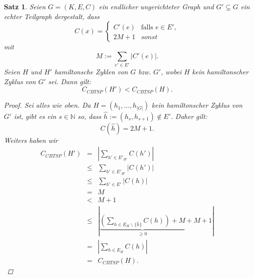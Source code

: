 \documentclass[10pt,oneside,a4paper]{report}
\newcommand{\nat}{\mathbb{N}}
\newtheorem{Def}{Definition}
\newtheorem{Satz}[Def]{Satz}
\begin{document}
\begin{Satz}
	Seien $G=(K,E,C)$ ein endlicher ungerichteter Graph und $G'\subsetneq G$ ein echter Teilgraph dergestalt, dass
	$$C(x) =
	\begin{cases}
		C'(e) & \text{falls } e\in E',\\
		2M+1 & sonst
	\end{cases}$$
	mit 
	$$M:= \sum_{e'\in E'}|C'(e)|.$$
	Seien $H$ und $H'$ hamiltonsche Zyklen von $G$ bzw. $G'$, wobei $H$ kein hamiltonscher Zyklus von $G'$ sei.
	Dann gilt:
	$$C_{CBTSP}(H') < C_{CBTSP}(H).$$
	\begin{proof}
		Sei alles wie oben. Da $H=(h_1,...,h_{|G|})$ kein hamiltonscher Zyklus von $G'$ ist, gibt es ein $s\in \nat$ so, dass $\hat{h}:=(h_s,h_{s+1})\notin E'$. Daher gilt:
		$$C(\hat{h}) = 2M+1.$$
		Weiters haben wir
		\begin{eqnarray}
		C_{CBTSP}(H')&=&\left|\sum_{h'\in {E'}_{H'}}C(h')\right| \\
		&\leq&\sum_{h'\in {E'}_{H'}}|C(h')|\\
		&\leq& \sum_{h'\in E'}|C(h)| \\
		&=& M\\
		&<& M + 1\\
		&\leq& \left|\underbrace{\left(\sum_{h\in {E_H\backslash\{\hat{h}\}}}C(h)\right) + M}_{\geq 0} + M +1\right|\\
		&=& \left|\sum_{h\in {E}_{H}}C(h)\right|\\
		&=& C_{CBTSP}(H).
		\end{eqnarray}
	\end{proof}
\end{Satz}


\end{document}
